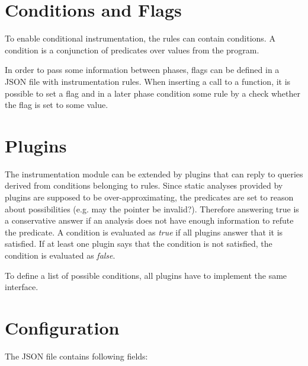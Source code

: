 \section{Conditions and Flags}\label{sec:conditions}

To enable conditional instrumentation, the rules can contain conditions. A
condition is a conjunction of predicates over values from the program.

In order to pass some information between phases, flags can be defined in a
JSON file with instrumentation rules. When inserting a call to a function, it
is possible to set a flag and in a later phase condition some rule by a check
whether the flag is set to some value.

\section{Plugins}

The instrumentation module can be extended by plugins that can reply to queries
derived from conditions belonging to rules. Since static analyses provided by
plugins are supposed to be over-approximating, the predicates are set to reason
about possibilities (e.g. may the pointer be invalid?). Therefore answering
true is a conservative answer if an analysis does not have enough information
to refute the predicate. A condition is evaluated as \emph{true} if all plugins
answer that it is satisfied. If at least one plugin says that the condition is
not satisfied, the condition is evaluated as \emph{false}.

To define a list of possible conditions, all plugins have to implement the same
interface.

\section{Configuration}


The JSON file contains following fields:


